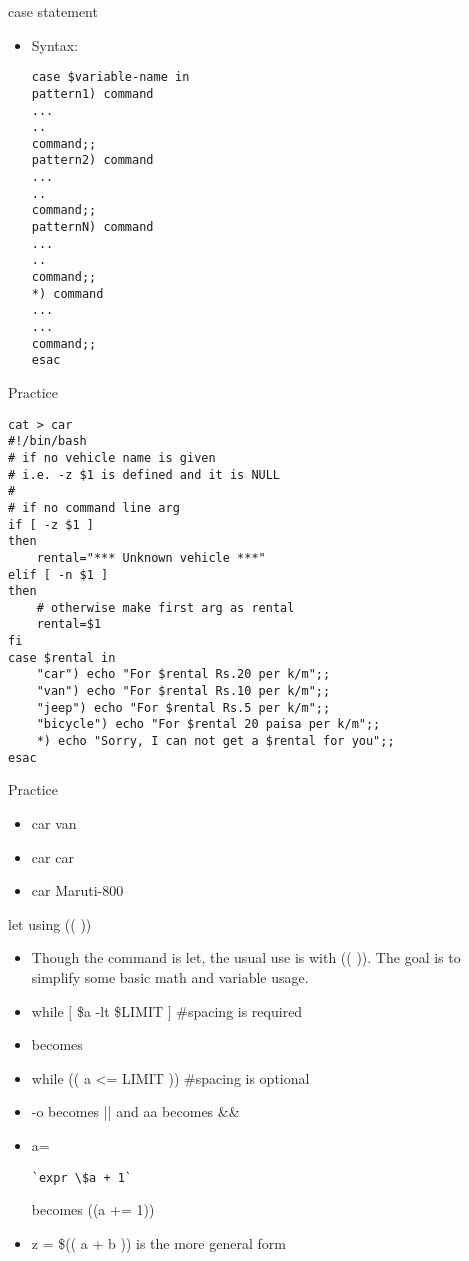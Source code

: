\documentclass{beamer}
\begin{document}
\begin{frame}[fragile]{case statement}
\begin{itemize}
\item Syntax: \\
\begin{lstlisting}
case $variable-name in 
pattern1) command 
... 
.. 
command;; 
pattern2) command 
... 
.. 
command;; 
patternN) command 
... 
.. 
command;; 
*) command 
... 
... 
command;; 
esac
\end{lstlisting}
\end{itemize}
\end{frame}

\begin{frame}[fragile]{Practice}
\begin{lstlisting}
cat > car
#!/bin/bash 
# if no vehicle name is given
# i.e. -z $1 is defined and it is NULL
#
# if no command line arg
if [ -z $1 ]
then
	rental="*** Unknown vehicle ***"
elif [ -n $1 ]
then
	# otherwise make first arg as rental
	rental=$1
fi
case $rental in
	"car") echo "For $rental Rs.20 per k/m";;
	"van") echo "For $rental Rs.10 per k/m";;
	"jeep") echo "For $rental Rs.5 per k/m";;
	"bicycle") echo "For $rental 20 paisa per k/m";;
	*) echo "Sorry, I can not get a $rental for you";;
esac
\end{lstlisting}
\end{frame}

\begin{frame}{Practice}
\begin{itemize}
\item car van
\item car car
\item car Maruti-800
\end{itemize}
\end{frame}

\begin{frame}[fragile]{let using (( )) }
\begin{itemize}
\item Though the command is let, the usual use is with (( )). The goal is to simplify some basic math and variable usage. 
\item while $[$ \$a -lt \$LIMIT $]$ \#spacing is required
\item becomes
\item while (( a <= LIMIT )) \#spacing is optional
\item -o becomes || and aa becomes \&\&
\item a=
\begin{lstlisting}
`expr \$a + 1` 
\end{lstlisting}
becomes ((a += 1))
\item z = \$(( a + b )) is the more general form
\end{itemize}
\end{frame}
\end{document}

